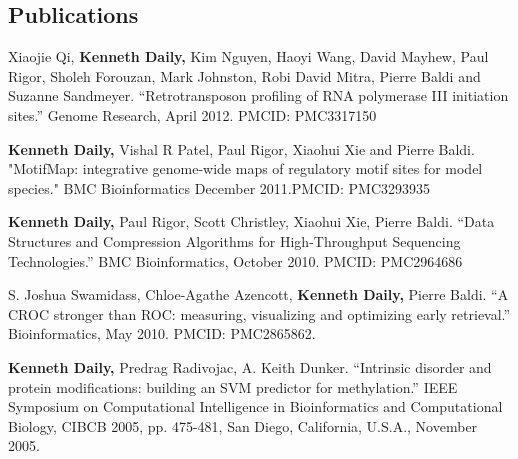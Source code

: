 \documentclass[margin,line]{res}
\begin{document}
\begin{resume}
        \section{\sc Publications}
        Xiaojie Qi, \textbf{Kenneth Daily,} Kim Nguyen, Haoyi Wang, David Mayhew, Paul Rigor, Sholeh Forouzan, Mark Johnston, Robi David Mitra, Pierre Baldi and Suzanne Sandmeyer. ``Retrotransposon profiling of RNA polymerase III initiation sites.'' Genome Research, April 2012. PMCID: PMC3317150
        
        \textbf{Kenneth Daily,} Vishal R Patel, Paul Rigor, Xiaohui Xie and Pierre Baldi. "MotifMap: integrative genome-wide maps of regulatory motif sites for model species." BMC Bioinformatics December 2011.PMCID: PMC3293935

        \textbf{Kenneth Daily,} Paul Rigor, Scott Christley, Xiaohui Xie, Pierre Baldi. ``Data Structures and Compression Algorithms for High-Throughput Sequencing Technologies.'' BMC Bioinformatics, October 2010. PMCID: PMC2964686

        S. Joshua Swamidass, Chloe-Agathe Azencott, \textbf{Kenneth Daily,} Pierre Baldi. ``A CROC stronger than ROC: measuring, visualizing and optimizing early retrieval.'' Bioinformatics, May 2010. PMCID: PMC2865862.
        
        \textbf{Kenneth Daily,} Predrag Radivojac, A. Keith Dunker. ``Intrinsic disorder and protein modifications: building an SVM predictor for methylation.'' IEEE Symposium on Computational Intelligence in Bioinformatics and Computational Biology, CIBCB 2005, pp. 475-481, San Diego, California, U.S.A., November 2005.
        
        
        
        

\end{resume}
\end{document}
